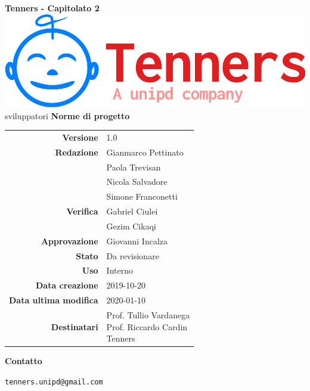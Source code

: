 \begin{titlepage}
	\begin{center}
		\large \textbf{Tenners - Capitolato 2}
		\vfill
		\includegraphics[scale = 0.3]{./res/img/logo.png}\\
sviluppatori		\vfill
		\Huge \textbf{Norme di progetto}

        \vfill
        \large

        \begin{tabular}{r|l}
                        \textbf{Versione} & 1.0 \\
                        \textbf{Redazione} &
                        Gianmarco Pettinato\\&
                        Paola Trevisan \\&
                        Nicola Salvadore \\&
												Simone Franconetti\\
                        \textbf{Verifica} &
                        Gabriel Ciulei \\&
                        Gezim Cikaqi \\
                        \textbf{Approvazione} & Giovanni Incalza\\
                        \textbf{Stato} & Da revisionare \\
                        \textbf{Uso} &  Interno\\
                        \textbf{Data creazione} &  2019-10-20\\
                        \textbf{Data ultima modifica} & 2020-01-10\\
                        \textbf{Destinatari} & \parbox[t]{5cm}{Prof. Tullio Vardanega\\Prof. Riccardo Cardin\\Tenners}
                \end{tabular}
                \vfill
                \normalsize
                \vfill
                \textbf{Contatto}

                \texttt{tenners.unipd@gmail.com}

	\end{center}
\end{titlepage}
